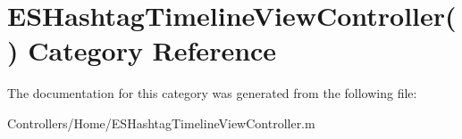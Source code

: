 \hypertarget{category_e_s_hashtag_timeline_view_controller_07_08}{}\section{E\+S\+Hashtag\+Timeline\+View\+Controller() Category Reference}
\label{category_e_s_hashtag_timeline_view_controller_07_08}


The documentation for this category was generated from the following file\+:\begin{DoxyCompactItemize}
\item 
Controllers/\+Home/E\+S\+Hashtag\+Timeline\+View\+Controller.\+m\end{DoxyCompactItemize}
